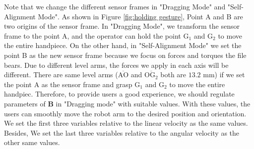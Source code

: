 \par
Note that we change the different sensor frames in "Dragging Mode" and "Self-Alignment Mode". As shown in Figure \ref{fig:holding gesture}, Point A and B are two origins of the sensor frame. In "Dragging Mode", we transform the sensor frame to the point A, and the operator can hold the point $\mathrm{G_1}$ and $\mathrm{G_2}$ to move the entire handpiece. On the other hand, in "Self-Alignment Mode" we set  the point B as the new sensor frame because we focus on forces and torques the file bears. Due to different level arms, the forces we apply in each axis will be different. There are same level arms ($\overline{\mathrm{AO}}$ and $\overline{\mathrm{OG_2}}$ both are $13.2$ mm) if we set the point A as the sensor frame and grasp $\mathrm{G_1}$ and $\mathrm{G_2}$ to move the entire handpiec. Therefore, to provide users a good experience, we should regulate parameters of $\mathbf{B}$ in "Dragging mode" with suitable values. With these values, the users can smoothly move the robot arm to the desired position and orientation. We set the first three variables relative to the linear velocity as the same values. Besides, We set the last three variables relative to the angular velocity as the other same values.
